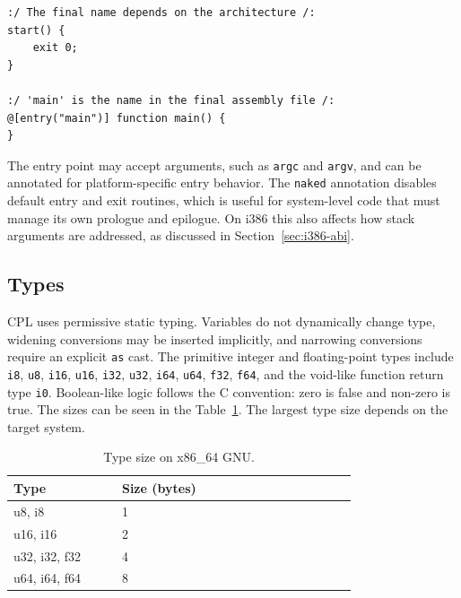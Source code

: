 \documentclass[10pt,twocolumn]{article}
\begin{document}
\FloatBarrier
\begin{lstlisting}[language=CPL,caption={Minimal CPL entry point.}]
:/ The final name depends on the architecture /:
start() {
    exit 0;
}

:/ 'main' is the name in the final assembly file /:
@[entry("main")] function main() {
}
\end{lstlisting}
\FloatBarrier

\par The entry point may accept arguments, such as \texttt{argc} and \texttt{argv}, and can be annotated for platform-specific entry behavior. The \texttt{naked} annotation disables default entry and exit routines, which is useful for system-level code that must manage its own prologue and epilogue. On i386 this also affects how stack arguments are addressed, as discussed in Section~\ref{sec:i386-abi}.

\subsection{Types}
\par CPL uses permissive static typing. Variables do not dynamically change type, widening conversions may be inserted implicitly, and narrowing conversions require an explicit \texttt{as} cast. The primitive integer and floating-point types include \texttt{i8}, \texttt{u8}, \texttt{i16}, \texttt{u16}, \texttt{i32}, \texttt{u32}, \texttt{i64}, \texttt{u64}, \texttt{f32}, \texttt{f64}, and the void-like function return type \texttt{i0}. Boolean-like logic follows the C convention: zero is false and non-zero is true. The sizes can be seen in the Table~\ref{tab:type_sizes}. The largest type size depends on the target system.

\begin{table}[t]
    \centering
    \footnotesize
    \caption{Type size on x86\_64 GNU.}
    \label{tab:type_sizes}
    \begin{tabular}{p{0.24\linewidth}p{0.20\linewidth}p{0.32\linewidth}}
    \toprule
    Type          & Size (bytes) \\
    \midrule
    u8, i8        & 1             \\
    u16, i16      & 2             \\
    u32, i32, f32 & 4             \\
    u64, i64, f64 & 8             \\
    \bottomrule
    \end{tabular}
\end{table}
\end{document}
